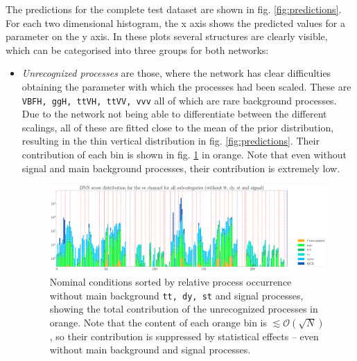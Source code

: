 \Subsection{\textcolor{red}{Network Predictions}}

The predictions for the complete test dataset are shown in fig. \ref{fig:predictions}. For each two dimensional histogram, the x axis shows the predicted values for a parameter on the y axis. In these plots several structures are clearly visible, which can be categorised into three groups for both networks:

\begin{itemize}
	\item[] \textit{Unrecognized processes} are those, where the network has clear difficulties obtaining the parameter with which the processes had been scaled. These are \texttt{VBFH, ggH, ttVH, ttVV, vvv} all of which are rare background processes. Due to the network not being able to differentiate between the different scalings, all of these are fitted close to the mean of the prior distribution, resulting in the thin vertical distribution in fig. \ref{fig:predictions}. Their contribution of each bin is shown in fig. \ref{fig:cond_without_sig_bkg} in orange. Note that even without signal and main background processes, their contribution is extremely low.
	
	\begin{figure}[h!]
		\centering
		\includegraphics[width=\linewidth]{figures/inference/cond4_sorted_no_main_bkg_no_sig.pdf}
		\caption{Nominal conditions sorted by relative process occurrence without main background \texttt{tt, dy, st} and signal processes, showing the total contribution of the unrecognized processes in orange. Note that the content of each orange bin is $\lesssim\mathcal{O}(\sqrt{N})$, so their contribution is suppressed by statistical effects -- even without main background and signal processes.}
		\label{fig:cond_without_sig_bkg}
	\end{figure}
	

\end{itemize}

